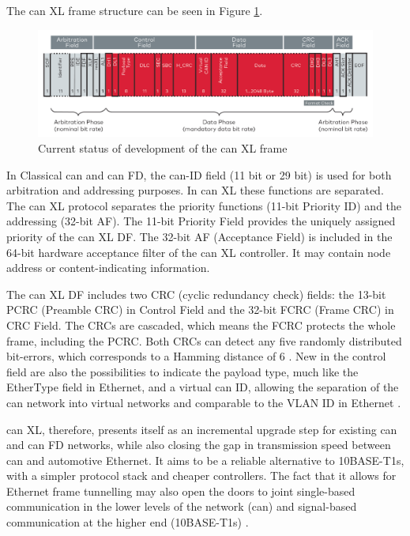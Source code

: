The \gls{can} XL frame structure can be seen in Figure \ref{fig:CANXL_Frame}.

\begin{figure}
    \centering
    \includegraphics[width = \textwidth]{img/parts/introduction/CAN XL.png}
    \caption{Current status of development of the \gls{can} XL frame \citep{VectorCANXL}}
    \label{fig:CANXL_Frame}
\end{figure}

In Classical \gls{can} and \gls{can} FD, the \gls{can}-ID field (11 bit or 29 bit) is used for both arbitration and addressing purposes. In \gls{can} XL these functions are separated. The \gls{can} XL protocol separates the priority functions (11-bit Priority ID) and the addressing (32-bit AF). The 11-bit Priority Field provides the uniquely assigned priority of the \gls{can} XL DF. The 32-bit AF (Acceptance Field) is included in the 64-bit hardware acceptance filter of the \gls{can} XL controller. It may contain node address or content-indicating information.\par
The \gls{can} XL DF includes two CRC (cyclic redundancy check) fields: the 13-bit PCRC (Preamble CRC) in Control Field and the 32-bit FCRC (Frame CRC) in CRC Field. The CRCs are cascaded, which means the FCRC protects the whole frame, including the PCRC. Both CRCs can detect any five randomly distributed bit-errors, which corresponds to a Hamming distance of 6 \citep{CiACANXL}. New in the control field are also the possibilities to indicate the payload type, much like the EtherType field in Ethernet, and a virtual \gls{can} ID, allowing the separation of the \gls{can} network into virtual networks and comparable to the VLAN ID in Ethernet \citep{BoschCANXL}.\par
\gls{can} XL, therefore, presents itself as an incremental upgrade step for existing \gls{can} and \gls{can} FD networks, while also closing the gap in transmission speed between \gls{can} and automotive Ethernet. It aims to be a reliable alternative to 10BASE-T1s, with a simpler protocol stack and cheaper controllers. The fact that it allows for Ethernet frame tunnelling may also open the doors to joint single-based communication in the lower levels of the network (\gls{can}) and signal-based communication at the higher end (10BASE-T1s) \citep{VectorCANXL}.

